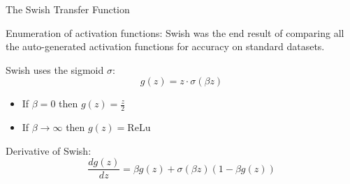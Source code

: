 \begin{frame}{The Swish Transfer Function \cite{Ramachandran2017}}

\begin{block}{Enumeration of activation functions:}
Swish was the end result of comparing all the auto-generated activation functions for accuracy on standard datasets.
\end{block}

\begin{block}{Swish uses the sigmoid $\sigma$:}
\[ g(z) = z \cdot \sigma(\beta z) \]
\begin{itemize}[<+->]
	\item If $\beta = 0$ then $g(z) = \frac{z}{2}$ 
	\item If $\beta \rightarrow \infty$ then $g(z) = \textrm{ReLu}$
\end{itemize}
\end{block}

\pause
\begin{block}{Derivative of Swish:}
\[ \frac{d g(z)}{dz} = \beta g(z) + \sigma(\beta z)(1 - \beta g(z)) \]
\end{block}
\end{frame}


